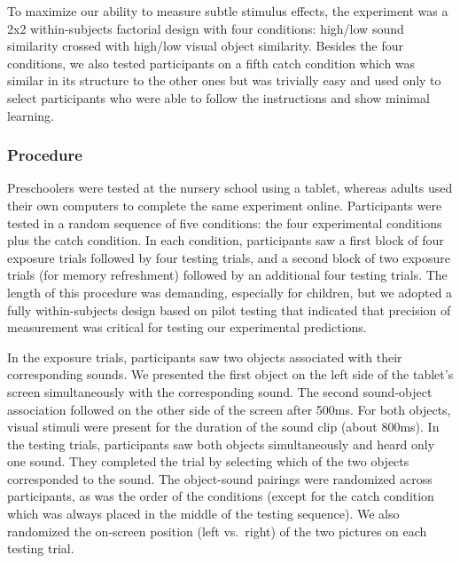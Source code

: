 \documentclass[english,,man]{apa6}
\theoremstyle{definition}
\theoremstyle{definition}
\theoremstyle{definition}
\theoremstyle{remark}
\begin{document}
To maximize our ability to measure subtle stimulus effects, the
experiment was a 2x2 within-subjects factorial design with four
conditions: high/low sound similarity crossed with high/low visual
object similarity. Besides the four conditions, we also tested
participants on a fifth catch condition which was similar in its
structure to the other ones but was trivially easy and used only to
select participants who were able to follow the instructions and show
minimal learning.

\subsubsection{Procedure}\label{procedure}

Preschoolers were tested at the nursery school using a tablet, whereas
adults used their own computers to complete the same experiment online.
Participants were tested in a random sequence of five conditions: the
four experimental conditions plus the catch condition. In each
condition, participants saw a first block of four exposure trials
followed by four testing trials, and a second block of two exposure
trials (for memory refreshment) followed by an additional four testing
trials. The length of this procedure was demanding, especially for
children, but we adopted a fully within-subjects design based on pilot
testing that indicated that precision of measurement was critical for
testing our experimental predictions.

In the exposure trials, participants saw two objects associated with
their corresponding sounds. We presented the first object on the left
side of the tablet's screen simultaneously with the corresponding sound.
The second sound-object association followed on the other side of the
screen after 500ms. For both objects, visual stimuli were present for
the duration of the sound clip (about 800ms). In the testing trials,
participants saw both objects simultaneously and heard only one sound.
They completed the trial by selecting which of the two objects
corresponded to the sound. The object-sound pairings were randomized
across participants, as was the order of the conditions (except for the
catch condition which was always placed in the middle of the testing
sequence). We also randomized the on-screen position (left vs.~right) of
the two pictures on each testing trial.
\end{document}
